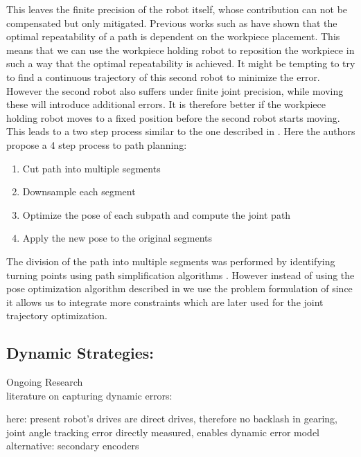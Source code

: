 \documentclass[5p,times,procedia]{elsarticle}
\begin{document}
This leaves the finite precision of the robot itself, whose contribution can not be compensated but only mitigated.
Previous works such as \cite{previous_work} have shown that the optimal repeatability of a path is dependent on the workpiece placement.
This means that we can use the workpiece holding robot to reposition the workpiece in such a way that the optimal repeatability is achieved.
It might be tempting to try to find a continuous trajectory of this second robot to minimize the error.
However the second robot also suffers under finite joint precision, while moving these will introduce additional errors.
It is therefore better if the workpiece holding robot moves to a fixed position before the second robot starts moving.
This leads to a two step process similar to the one described in \cite{stroke_division}.
Here the authors propose a 4 step process to path planning:
\begin{enumerate}
	\item Cut path into multiple segments
	\item Downsample each segment
	\item Optimize the pose of each subpath and compute the joint path
	\item Apply the new pose to the original segments
\end{enumerate}
The division of the path into multiple segments was performed by identifying turning points using path simplification algorithms \cite{stroke_division}.
However instead of using the pose optimization algorithm described in \cite{stroke_division} we use the problem formulation of \cite{previous_work} since it allows us to integrate more constraints which are later used for the joint trajectory optimization.



\subsection{Dynamic Strategies:}\label{subsec:dynError} Ongoing Research \\
literature on capturing dynamic errors:

here: present robot’s drives are direct drives, therefore no backlash in gearing, joint angle tracking error directly measured, 
enables dynamic error model
alternative: secondary encoders~\cite{Mesmer22}
\end{document}
